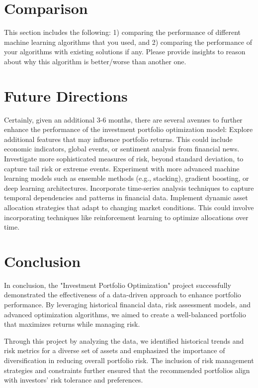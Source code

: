 \documentclass[conference]{IEEEtran}
\begin{document}
\section{Comparison}  
This section includes the following: 1) comparing the performance of different machine learning algorithms that you used, and 2) comparing the performance of your algorithms with existing solutions if any. Please provide insights to reason about why this algorithm is better/worse than another one.

\section{Future Directions}
Certainly, given an additional 3-6 months, there are several avenues to further enhance the performance of the investment portfolio optimization model: Explore additional features that may influence portfolio returns. This could include economic indicators, global events, or sentiment analysis from financial news. Investigate more sophisticated measures of risk, beyond standard deviation, to capture tail risk or extreme events. Experiment with more advanced machine learning models such as ensemble methods (e.g., stacking), gradient boosting, or deep learning architectures. Incorporate time-series analysis techniques to capture temporal dependencies and patterns in financial data. Implement dynamic asset allocation strategies that adapt to changing market conditions. This could involve incorporating techniques like reinforcement learning to optimize allocations over time.

\section{Conclusion}
In conclusion, the "Investment Portfolio Optimization" project successfully demonstrated the effectiveness of a data-driven approach to enhance portfolio performance. By leveraging historical financial data, risk assessment models, and advanced optimization algorithms, we aimed to create a well-balanced portfolio that maximizes returns while managing risk. 

Through this project by analyzing the data, we identified historical trends and risk metrics for a diverse set of assets and emphasized the importance of diversification in reducing overall portfolio risk. The inclusion of risk management strategies and constraints further ensured that the recommended portfolios align with investors' risk tolerance and preferences.
\end{document}
